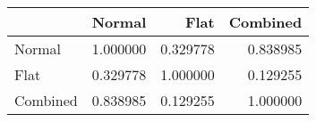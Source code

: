 \begin{tabular}{lrrr}
\toprule
{} &    Normal &      Flat &  Combined \\
\midrule
Normal   &  1.000000 &  0.329778 &  0.838985 \\
Flat     &  0.329778 &  1.000000 &  0.129255 \\
Combined &  0.838985 &  0.129255 &  1.000000 \\
\bottomrule
\end{tabular}
